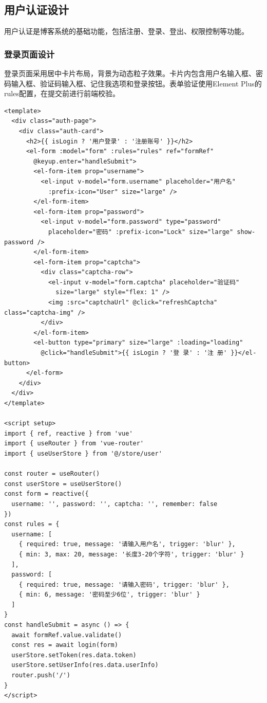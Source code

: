 \documentclass[12pt,a4paper]{article}
\begin{document}
\subsection{用户认证设计}

用户认证是博客系统的基础功能，包括注册、登录、登出、权限控制等功能。

\subsubsection{登录页面设计}

登录页面采用居中卡片布局，背景为动态粒子效果。卡片内包含用户名输入框、密码输入框、验证码输入框、记住我选项和登录按钮。表单验证使用Element Plus的rules配置，在提交前进行前端校验。

\begin{lstlisting}[language={}, basicstyle=\ttfamily\small, caption=登录页面代码]
<template>
  <div class="auth-page">
    <div class="auth-card">
      <h2>{{ isLogin ? '用户登录' : '注册账号' }}</h2>
      <el-form :model="form" :rules="rules" ref="formRef"
        @keyup.enter="handleSubmit">
        <el-form-item prop="username">
          <el-input v-model="form.username" placeholder="用户名"
            :prefix-icon="User" size="large" />
        </el-form-item>
        <el-form-item prop="password">
          <el-input v-model="form.password" type="password"
            placeholder="密码" :prefix-icon="Lock" size="large" show-password />
        </el-form-item>
        <el-form-item prop="captcha">
          <div class="captcha-row">
            <el-input v-model="form.captcha" placeholder="验证码"
              size="large" style="flex: 1" />
            <img :src="captchaUrl" @click="refreshCaptcha" class="captcha-img" />
          </div>
        </el-form-item>
        <el-button type="primary" size="large" :loading="loading"
          @click="handleSubmit">{{ isLogin ? '登 录' : '注 册' }}</el-button>
      </el-form>
    </div>
  </div>
</template>

<script setup>
import { ref, reactive } from 'vue'
import { useRouter } from 'vue-router'
import { useUserStore } from '@/store/user'

const router = useRouter()
const userStore = useUserStore()
const form = reactive({
  username: '', password: '', captcha: '', remember: false
})
const rules = {
  username: [
    { required: true, message: '请输入用户名', trigger: 'blur' },
    { min: 3, max: 20, message: '长度3-20个字符', trigger: 'blur' }
  ],
  password: [
    { required: true, message: '请输入密码', trigger: 'blur' },
    { min: 6, message: '密码至少6位', trigger: 'blur' }
  ]
}
const handleSubmit = async () => {
  await formRef.value.validate()
  const res = await login(form)
  userStore.setToken(res.data.token)
  userStore.setUserInfo(res.data.userInfo)
  router.push('/')
}
</script>
\end{lstlisting}
\end{document}
